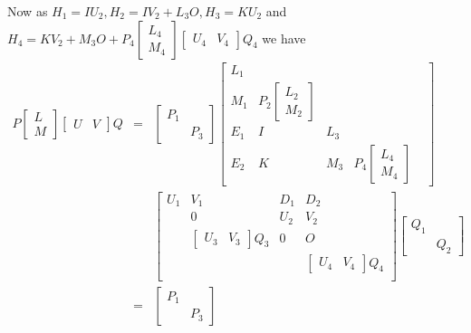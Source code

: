 \documentclass{article}
\begin{document}
Now as
$H_1=IU_2, H_2=IV_2 + L_3 O, H_3=KU_2$ and
$H_4=KV_2+M_3O+P_4
\begin{bmatrix}
  L_4\\M_4
\end{bmatrix}
\begin{bmatrix}
  U_4&V_4
\end{bmatrix}
Q_4 $
we have
\begin{eqnarray*}
    P
  \begin{bmatrix}
    L\\M
  \end{bmatrix}
  \begin{bmatrix}
    U&V
  \end{bmatrix}
Q &=&   \begin{bmatrix}
    P_1\\&P_3
  \end{bmatrix}
\left[
  \begin{array}{cccccc}
  L_1 &   \\
  M_1 & P_2
  \begin{bmatrix}
    L_2\\M_2
  \end{bmatrix}\\
  \hline
  E_1   &  I  &L_3\\
  E_{2} &K & M_{3}  & P_4
  \begin{bmatrix}
    L_4\\M_4
  \end{bmatrix}&
  \end{array}
\right]
\\&&
\left[
\begin{array}{cc|cccc}
  U_1 & V_1 &D_1 & D_2\\
      & 0   & U_2& V_2 \\
      &\begin{bmatrix}U_3&V_3\end{bmatrix} Q_3 &0 & O\\
      &                 &    &\begin{bmatrix}U_4&V_4\end{bmatrix} Q_4\\
\end{array}
\right]
  \begin{bmatrix}
    Q_1\\&Q_2
  \end{bmatrix}
\\&=&   
\begin{bmatrix}
    P_1\\&P_3
  \end{bmatrix}

\end{eqnarray*}
\end{document}
